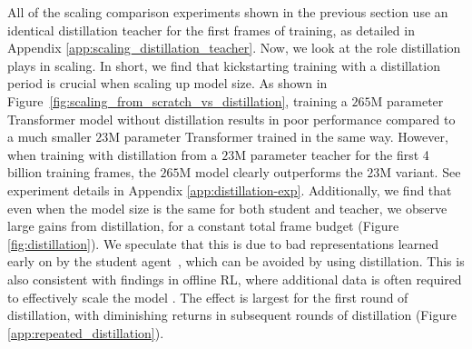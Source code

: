 \documentclass[11pt, a4paper, logo, copyright]{deepmind}
\begin{document}
All of the scaling comparison experiments shown in the previous section use an identical distillation teacher for the first frames of training, as detailed in Appendix \ref{app:scaling_distillation_teacher}. Now, we look at the role distillation plays in scaling. In short, we find that kickstarting training with a distillation period is crucial when scaling up model size. As shown in Figure~\ref{fig:scaling_from_scratch_vs_distillation}, training a $265$M parameter Transformer model without distillation results in poor performance compared to a much smaller $23$M parameter Transformer trained in the same way. However, when training with distillation from a $23$M parameter teacher for the first 4 billion training frames, the $265$M model clearly outperforms the $23$M variant. See experiment details in Appendix \ref{app:distillation-exp}.
Additionally, we find that even when the model size is the same for both student and teacher, we observe large gains from distillation, for a constant total frame budget (Figure \ref{fig:distillation}). We speculate that this is due to bad representations learned early on by the student agent~\citep{nikishin2022primacy, cetin22stabilizing}, which can be avoided by using distillation. This is also consistent with findings in offline RL, where additional data is often required to effectively scale the model \citep{reid2022wikipedia}. The effect is largest for the first round of distillation, with diminishing returns in subsequent rounds of distillation (Figure \ref{app:repeated_distillation}).
\end{document}
